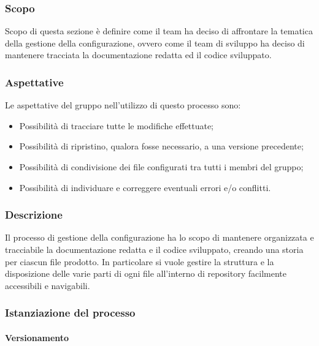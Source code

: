 \subsubsection{Scopo}
Scopo di questa sezione è definire come il team \groupName{} ha deciso di affrontare la tematica della gestione della configurazione, ovvero come il team di sviluppo ha deciso di mantenere tracciata la documentazione redatta ed il codice sviluppato.

\subsubsection{Aspettative}
Le aspettative del gruppo \groupName{} nell'utilizzo di questo processo sono:
\begin{itemize}
    \item Possibilità di tracciare tutte le modifiche effettuate;
    \item Possibilità di ripristino, qualora fosse necessario, a una versione precedente;
    \item Possibilità di condivisione dei file configurati tra tutti i membri del gruppo;
    \item Possibilità di individuare e correggere eventuali errori e/o conflitti.
\end{itemize}

\subsubsection{Descrizione}
Il processo di gestione della configurazione ha lo scopo di mantenere organizzata e tracciabile la documentazione redatta e il codice sviluppato, creando una storia per ciascun file prodotto.
In particolare si vuole gestire la struttura e la disposizione delle varie parti di ogni file all'interno di repository\glo{} facilmente accessibili e navigabili.
\subsubsection{Istanziazione del processo}
\paragraph{Versionamento} \label{paragraph:versionamento}
